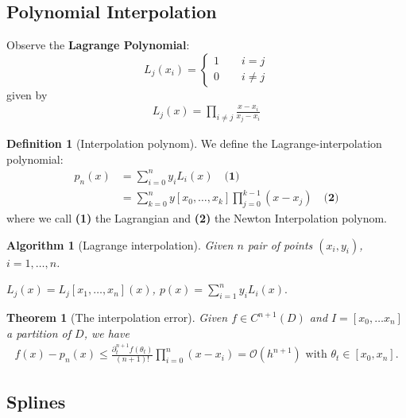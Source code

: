 \documentclass[a4paper,12pt,oneside,fleqn]{book}
\newtheorem{theorem}{Theorem}[section]
\newtheorem{algorithm}{Algorithm}[section]
\theoremstyle{definition}
\newtheorem{definition}{Definition}[section]
\theoremstyle{remark}
\begin{document}
\subsection{Polynomial Interpolation}
Observe the \textbf{Lagrange Polynomial}:
\begin{equation}
	L_j(x_i) = 
	\left\{
	\begin{aligned}
		1 \qquad i = j\\
		0 \qquad i \neq j
	\end{aligned}
	\right.
\end{equation}
given by
\begin{align*}
	L_j(x) = \prod_{i \neq j} \frac{x - x_i}{x_j - x_i}
\end{align*}
\begin{definition}[Interpolation polynom]
	We define the Lagrange-interpolation polynomial:
\begin{align*}
	p_n(x) &= \sum_{i = 0}^n y_i L_i(x) \quad \textbf{(1)}\\
	&= \sum_{k = 0}^n y[x_0, \dots, x_k] \prod_{j = 0}^{k - 1} (x - x_j) \quad \textbf{(2)}
\end{align*}
where we call \textbf{(1)} the Lagrangian and \textbf{(2)} the Newton Interpolation polynom.
\end{definition}

\begin{algorithm}[Lagrange interpolation]
Given $n$ pair of points $(x_i, y_i)$, $i = 1, \dots, n$. 
\begin{algorithmic}
\State $L_j(x) = L_j[x_1, \dots, x_n](x)$, 
\State $p(x) = \sum_{i = 1}^n y_i L_i(x).  $
\EndFor
\end{algorithmic}
\end{algorithm}


\begin{theorem}[The interpolation error]
Given $f \in C^{n + 1}(D)$ and $I = [x_0, \dots x_n]$ a partition of $D$, we have
\begin{align*}
	f(x) - p_n(x) \le \frac{\partial^{n + 1}_t f(\theta_t)}{(n+1)!} \prod_{i = 0}^n (x - x_i) = \mathcal{O}(h^{n + 1}) \text{ with } \theta_t \in [x_0, x_n].
\end{align*}
\end{theorem}

\subsection{Splines}
\end{document}
